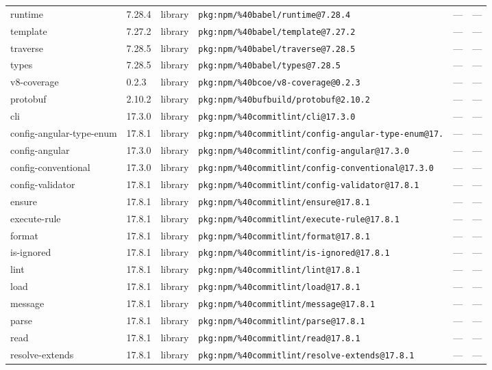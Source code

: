 \documentclass[11pt]{article}
\begin{document}
\begin{longtable}{|l|l|l|p{2.2cm}|l|p{4cm}|}
runtime & 7.28.4 & library & \texttt{pkg:npm/\%40babel/runtime@7.28.4} & — & — \\
template & 7.27.2 & library & \texttt{pkg:npm/\%40babel/template@7.27.2} & — & — \\
traverse & 7.28.5 & library & \texttt{pkg:npm/\%40babel/traverse@7.28.5} & — & — \\
types & 7.28.5 & library & \texttt{pkg:npm/\%40babel/types@7.28.5} & — & — \\
v8-coverage & 0.2.3 & library & \texttt{pkg:npm/\%40bcoe/v8-coverage@0.2.3} & — & — \\
protobuf & 2.10.2 & library & \texttt{pkg:npm/\%40bufbuild/protobuf@2.10.2} & — & — \\
cli & 17.3.0 & library & \texttt{pkg:npm/\%40commitlint/cli@17.3.0} & — & — \\
config-angular-type-enum & 17.8.1 & library & \texttt{pkg:npm/\%40commitlint/config-angular-type-enum@17.} & — & — \\
config-angular & 17.3.0 & library & \texttt{pkg:npm/\%40commitlint/config-angular@17.3.0} & — & — \\
config-conventional & 17.3.0 & library & \texttt{pkg:npm/\%40commitlint/config-conventional@17.3.0} & — & — \\
config-validator & 17.8.1 & library & \texttt{pkg:npm/\%40commitlint/config-validator@17.8.1} & — & — \\
ensure & 17.8.1 & library & \texttt{pkg:npm/\%40commitlint/ensure@17.8.1} & — & — \\
execute-rule & 17.8.1 & library & \texttt{pkg:npm/\%40commitlint/execute-rule@17.8.1} & — & — \\
format & 17.8.1 & library & \texttt{pkg:npm/\%40commitlint/format@17.8.1} & — & — \\
is-ignored & 17.8.1 & library & \texttt{pkg:npm/\%40commitlint/is-ignored@17.8.1} & — & — \\
lint & 17.8.1 & library & \texttt{pkg:npm/\%40commitlint/lint@17.8.1} & — & — \\
load & 17.8.1 & library & \texttt{pkg:npm/\%40commitlint/load@17.8.1} & — & — \\
message & 17.8.1 & library & \texttt{pkg:npm/\%40commitlint/message@17.8.1} & — & — \\
parse & 17.8.1 & library & \texttt{pkg:npm/\%40commitlint/parse@17.8.1} & — & — \\
read & 17.8.1 & library & \texttt{pkg:npm/\%40commitlint/read@17.8.1} & — & — \\
resolve-extends & 17.8.1 & library & \texttt{pkg:npm/\%40commitlint/resolve-extends@17.8.1} & — & — \\

\end{longtable}
\end{document}

